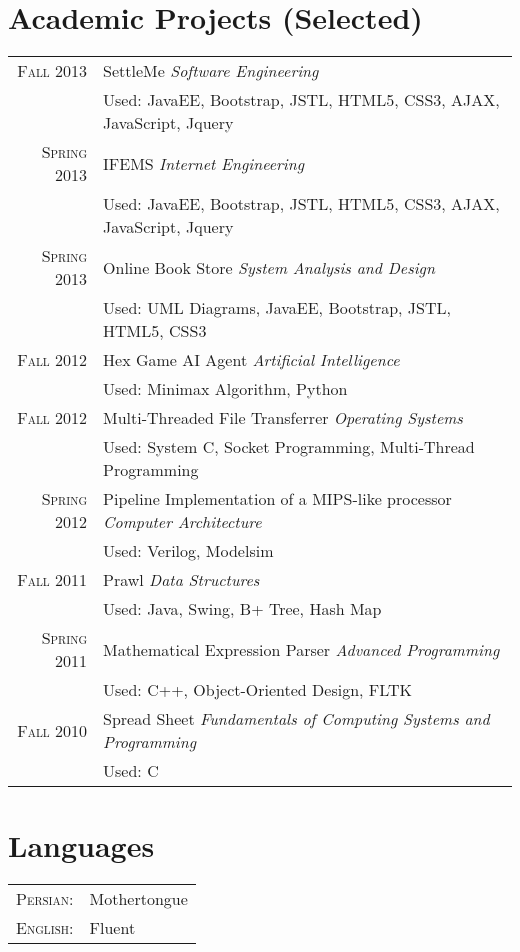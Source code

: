 \documentclass[a4paper,10pt]{article}
\begin{document}
\section{Academic Projects (Selected)}
\begin{tabular}{rl}
 \textsc{Fall} 2013 & SettleMe \textit{\footnotesize{Software Engineering}} \\ &
 \footnotesize{Used: JavaEE, Bootstrap, JSTL, HTML5, CSS3, AJAX, JavaScript, Jquery}\\
\textsc{Spring} 2013 & IFEMS \textit{\footnotesize{Internet Engineering}} \\ &
\footnotesize{Used: JavaEE, Bootstrap, JSTL, HTML5, CSS3, AJAX, JavaScript, Jquery}\\
\textsc{Spring} 2013 & Online Book Store \textit{\footnotesize{System Analysis and Design}} \\ &
\footnotesize{Used: UML Diagrams, JavaEE, Bootstrap, JSTL, HTML5, CSS3}\\
\textsc{Fall} 2012 & Hex Game AI Agent \textit{\footnotesize{Artificial Intelligence}} \\ &
\footnotesize{Used: Minimax Algorithm, Python}\\
\textsc{Fall} 2012 & Multi-Threaded File Transferrer \textit{\footnotesize{Operating Systems}} \\ &
\footnotesize{Used: System C, Socket Programming, Multi-Thread Programming}\\
\textsc{Spring} 2012 & Pipeline Implementation of a MIPS-like processor \textit{\footnotesize{Computer Architecture}} \\ &
\footnotesize{Used: Verilog, Modelsim}\\
\textsc{Fall} 2011 & Prawl \textit{\footnotesize{Data Structures}} \\ &
\footnotesize{Used: Java, Swing, B+ Tree, Hash Map}\\
\textsc{Spring} 2011 & Mathematical Expression Parser \textit{\footnotesize{Advanced Programming}} \\ &
\footnotesize{Used: C++, Object-Oriented Design, FLTK}\\
\textsc{Fall} 2010 & Spread Sheet \textit{\footnotesize{Fundamentals of Computing Systems and Programming}} \\ &
\footnotesize{Used: C}\\
\end{tabular}

\section{Languages}
\begin{tabular}{rl}
 \textsc{Persian:}&Mothertongue\\
\textsc{English:}&Fluent
\end{tabular}
\end{document}
